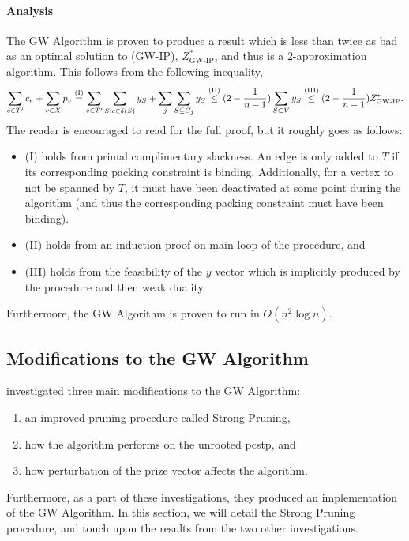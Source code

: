  \paragraph{Analysis}
 The GW Algorithm is proven to produce a result which is less than twice as bad as an optimal solution to (GW-IP), $Z^*_{\text{GW-IP}}$, and thus
 is a 2-approximation algorithm. This follows from the following inequality,
 $$\sum_{e \in T'}c_e + \sum_{v \in X} p_v \overset{\text{(I)}}{=}   \sum_{e \in T'} \sum_{S: e \in \delta(S)} y_S  + \sum_{j} \sum_{S \subseteq C_j} y_S
 \overset{\text{(II)}}{\leq} (2 - \frac{1}{n-1}) \sum_{S \subset V} y_S \overset{\text{(III)}}{\leq} (2 - \frac{1}{n-1}) Z^*_{\text{GW-IP}}\mathnormal{.}$$
 The reader is encouraged to read \citet{goemans1997primal} for the full proof, but it roughly goes as follows:
 \begin{itemize}
 \item (I) holds from primal complimentary slackness. An edge is only added to $T$ if its corresponding packing constraint is binding.
   Additionally, for a vertex to not be spanned by $T$, it must have been deactivated at some point during the
    algorithm (and thus the corresponding packing constraint must have
    been binding).
  \item (II) holds from an induction proof on main loop of the procedure, and
  \item (III) holds from the feasibility of the $y$ vector which is implicitly produced by the procedure and then weak duality.
 \end{itemize}
 Furthermore, the GW Algorithm is proven to run in $O(n^2 \log n)$.
 \subsection{Modifications to the GW Algorithm}\label{sec:approx:strongpruning}
 \citet{Johnson:2000:PCS:338219.338637} investigated three main modifications to the GW Algorithm:
 \begin{enumerate}
 \item an improved pruning procedure called Strong Pruning,
 \item how the algorithm performs on the unrooted \gls{pcstp}, and
 \item how perturbation of the prize vector affects the algorithm.
 \end{enumerate}
 Furthermore, as a part of these investigations, they produced an implementation of the GW Algorithm.
 In this section, we will detail the Strong Pruning procedure, and touch upon the results from the two other
  investigations.
